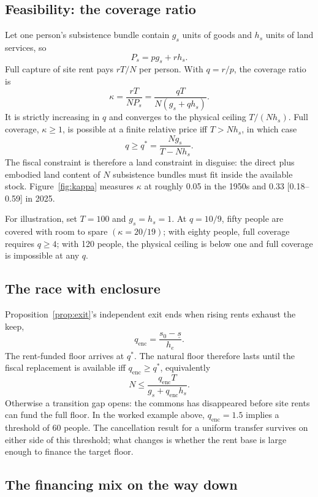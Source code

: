 \documentclass[12pt]{article}
\theoremstyle{plain}
\begin{document}
\subsection{Feasibility: the coverage ratio}\label{app:coverage}

Let one person's subsistence bundle contain $g_s$ units of goods and $h_s$ units of land services, so
\[
P_s=pg_s+rh_s.
\]
Full capture of site rent pays $rT/N$ per person. With $q=r/p$, the coverage ratio is
\[
\kappa=\frac{rT}{NP_s}
      =\frac{qT}{N(g_s+qh_s)}.
\]
It is strictly increasing in $q$ and converges to the physical ceiling $T/(Nh_s)$. Full coverage, $\kappa\ge1$, is possible at a finite relative price iff $T>Nh_s$, in which case
\[
q\ge q^*=\frac{Ng_s}{T-Nh_s}.
\]
The fiscal constraint is therefore a land constraint in disguise: the direct plus embodied land content of $N$ subsistence bundles must fit inside the available stock. Figure~\ref{fig:kappa} measures $\kappa$ at roughly 0.05 in the 1950s and 0.33 [0.18--0.59] in 2025.

For illustration, set $T=100$ and $g_s=h_s=1$. At $q=10/9$, fifty people are covered with room to spare $(\kappa=20/19)$; with eighty people, full coverage requires $q\ge4$; with 120 people, the physical ceiling is below one and full coverage is impossible at any $q$.

\subsection{The race with enclosure}\label{app:race}

Proposition~\ref{prop:exit}'s independent exit ends when rising rents exhaust the keep,
\[
q_{\mathrm{enc}}=\frac{s_0-\underline{s}}{h_e}.
\]
The rent-funded floor arrives at $q^*$. The natural floor therefore lasts until the fiscal replacement is available iff $q_{\mathrm{enc}}\ge q^*$, equivalently
\[
N\le \frac{q_{\mathrm{enc}}T}{g_s+q_{\mathrm{enc}}h_s}.
\]
Otherwise a transition gap opens: the commons has disappeared before site rents can fund the full floor. In the worked example above, $q_{\mathrm{enc}}=1.5$ implies a threshold of 60 people. The cancellation result for a uniform transfer survives on either side of this threshold; what changes is whether the rent base is large enough to finance the target floor.

\subsection{The financing mix on the way down}\label{app:mix}
\end{document}
